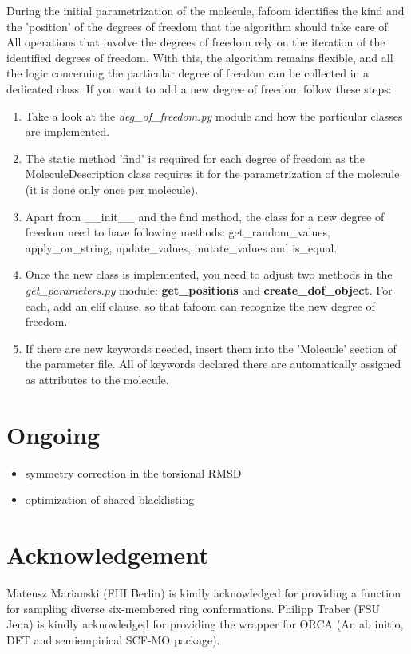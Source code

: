 \documentclass[a4paper]{article}
\begin{document}
During the initial parametrization of the molecule, fafoom identifies the kind and the 'position' of the degrees of freedom that the algorithm should take care of. All operations that involve the degrees of freedom  rely on the iteration of the identified degrees of freedom. With this, the algorithm remains flexible, and all the logic concerning the particular degree of freedom can be collected in a dedicated class. If you want to add a new degree of freedom follow these steps:
\begin{enumerate}
\item Take a look at the \textit{deg\_of\_freedom.py} module and how the particular classes are implemented.  
\item The static method 'find' is required for each degree of freedom as the MoleculeDescription class requires it for the parametrization of the molecule (it is done only once per molecule).
\item Apart from \_\_init\_\_ and the find method, the class for a new degree of freedom need to have following methods: get\_random\_values, apply\_on\_string,  update\_values, mutate\_values and is\_equal.
\item Once the new class is implemented, you need to adjust two methods in the \textit{get\_parameters.py} module: \textbf{get\_positions} and \textbf{create\_dof\_object}. For each, add an elif clause, so that fafoom can recognize the new degree of freedom. 
\item If there are new keywords needed, insert them into the 'Molecule' section of the parameter file. All of keywords declared there are automatically assigned as attributes to the molecule. 





\end{enumerate}


\section{Ongoing}

\begin{itemize}
\item{symmetry correction in the torsional RMSD}
\item{optimization of shared blacklisting}
\end{itemize}

\section{Acknowledgement}

Mateusz Marianski (FHI Berlin) is kindly acknowledged for providing a function for sampling diverse six-membered ring conformations. 
\newline
Philipp Traber (FSU Jena) is kindly acknowledged for providing the wrapper for ORCA (An ab initio, DFT and semiempirical SCF-MO package).
\end{document}
